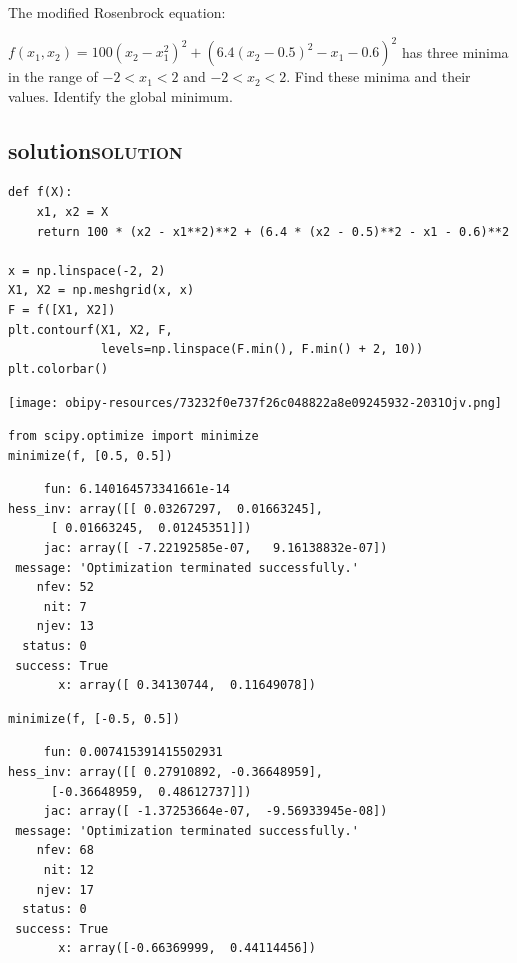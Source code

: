 \documentclass[11pt]{article}
\begin{document}
The modified Rosenbrock equation:

\(f(x_1, x_2) = 100 (x_2 - x_1^2)^2 + (6.4 (x_2 - 0.5)^2 - x_1 -0.6)^2\) has three minima in the range of \(-2 < x_1 < 2\) and \(-2 < x_2 < 2\). Find these minima and their values. Identify the global minimum.

\subsection{solution\hfill{}\textsc{solution}}
\label{sec:org78a8f9b}
\begin{verbatim}
def f(X):
    x1, x2 = X
    return 100 * (x2 - x1**2)**2 + (6.4 * (x2 - 0.5)**2 - x1 - 0.6)**2

x = np.linspace(-2, 2)
X1, X2 = np.meshgrid(x, x)
F = f([X1, X2])
plt.contourf(X1, X2, F,
             levels=np.linspace(F.min(), F.min() + 2, 10))
plt.colorbar()
\end{verbatim}

\begin{center}
\texttt{[image: obipy-resources/73232f0e737f26c048822a8e09245932-2031Ojv.png]}
\end{center}

\begin{verbatim}
from scipy.optimize import minimize
minimize(f, [0.5, 0.5])
\end{verbatim}

\begin{verbatim}
     fun: 6.140164573341661e-14
hess_inv: array([[ 0.03267297,  0.01663245],
      [ 0.01663245,  0.01245351]])
     jac: array([ -7.22192585e-07,   9.16138832e-07])
 message: 'Optimization terminated successfully.'
    nfev: 52
     nit: 7
    njev: 13
  status: 0
 success: True
       x: array([ 0.34130744,  0.11649078])
\end{verbatim}


\begin{verbatim}
minimize(f, [-0.5, 0.5])
\end{verbatim}

\begin{verbatim}
     fun: 0.007415391415502931
hess_inv: array([[ 0.27910892, -0.36648959],
      [-0.36648959,  0.48612737]])
     jac: array([ -1.37253664e-07,  -9.56933945e-08])
 message: 'Optimization terminated successfully.'
    nfev: 68
     nit: 12
    njev: 17
  status: 0
 success: True
       x: array([-0.66369999,  0.44114456])
\end{verbatim}
\end{document}
